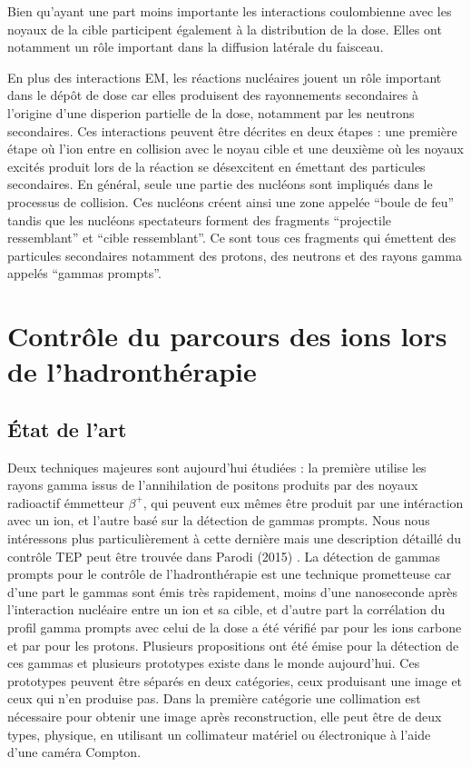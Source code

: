 \documentclass[11pt,a4paper,oldfontcommands]{memoir}
\begin{document}
Bien qu'ayant une part moins importante les interactions coulombienne avec les noyaux de la cible participent également à la distribution de la dose. Elles ont notamment un rôle important dans la diffusion latérale du faisceau.

En plus des interactions EM, les réactions nucléaires jouent un rôle important dans le dépôt de dose car elles produisent des rayonnements secondaires à l'origine d'une disperion partielle de la dose, notamment par les neutrons secondaires. Ces interactions peuvent être décrites en deux étapes : une première étape où l'ion entre en collision avec le noyau cible et une deuxième où les noyaux excités produit lors de la réaction se désexcitent en émettant des particules secondaires. En général, seule une partie des nucléons sont impliqués dans le processus de collision. Ces nucléons créent ainsi une zone appelée \enquote{boule de feu} tandis que les nucléons spectateurs forment des fragments \enquote{projectile ressemblant} et \enquote{cible ressemblant}. Ce sont tous ces fragments qui émettent des particules secondaires notamment des protons, des neutrons et des rayons gamma appelés \enquote{gammas prompts}.
\openany
\section{Contrôle du parcours des ions lors de l'hadronthérapie}

\subsection{\'Etat de l'art}

Deux techniques majeures sont aujourd'hui étudiées : la première utilise les rayons gamma issus de l'annihilation de positons produits par des noyaux radioactif émmetteur $\beta^+$, qui peuvent eux mêmes être produit par une intéraction avec un ion, et l'autre basé sur la détection de gammas prompts. Nous nous intéressons plus particulièrement à cette dernière mais une description détaillé du contrôle TEP peut être trouvée dans Parodi (2015) \cite{Parodi20157153}. La détection de gammas prompts pour le contrôle de l'hadronthérapie est une technique prometteuse car d'une part le gammas sont émis très rapidement, moins d'une nanoseconde après l’interaction nucléaire entre un ion et sa cible, et d'autre part la corrélation du profil gamma prompts avec celui de la dose a été vérifié par \cite{PGMonitoringC12}pour les ions carbone et par \cite{Min2006} pour les protons. Plusieurs propositions ont été émise pour la détection de ces gammas et plusieurs prototypes existe dans le monde aujourd'hui. Ces prototypes peuvent être séparés en deux catégories, ceux produisant une image et ceux qui n'en produise pas. Dans la première catégorie une collimation est nécessaire pour obtenir une image après reconstruction, elle peut être de deux types, physique, en utilisant un collimateur matériel ou électronique à l'aide d'une caméra Compton. 
\end{document}
